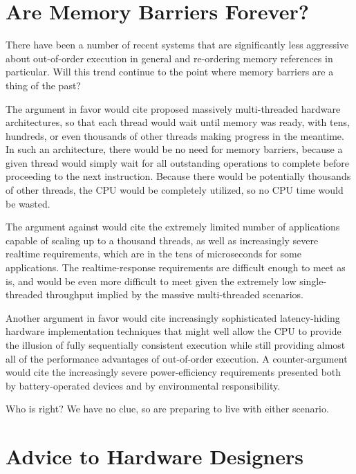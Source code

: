 \section{Are Memory Barriers Forever?}
\label{sec:app:whymb:Are Memory Barriers Forever?}

There have been a number of recent systems that are significantly less
aggressive about out-of-order execution in general and re-ordering
memory references in particular.
Will this trend continue to the point where memory barriers are a thing
of the past?

The argument in favor would cite proposed massively multi-threaded hardware
architectures, so that each thread would wait until memory was ready,
with tens, hundreds, or even thousands of other threads making progress
in the meantime.
In such an architecture, there would be no need for memory barriers,
because a given thread would simply wait for all outstanding operations
to complete before proceeding to the next instruction.
Because there would be potentially thousands of other threads, the
CPU would be completely utilized, so no CPU time would be wasted.

The argument against would cite the extremely limited number of applications
capable of scaling up to a thousand threads, as well as increasingly
severe realtime requirements, which are in the tens of microseconds
for some applications.
The realtime-response requirements are difficult enough to meet as is,
and would be even more difficult to meet given the extremely low
single-threaded throughput implied by the massive multi-threaded
scenarios.

Another argument in favor would cite increasingly sophisticated
latency-hiding hardware implementation techniques that might well allow
the CPU to provide the illusion of fully sequentially consistent
execution while still providing almost all of the performance advantages
of out-of-order execution.
A counter-argument would cite the increasingly severe power-efficiency
requirements presented both by battery-operated devices and by
environmental responsibility.

Who is right?
We have no clue, so are preparing to live with either scenario.

\section{Advice to Hardware Designers}
\label{sec:app:whymb:Advice to Hardware Designers}


